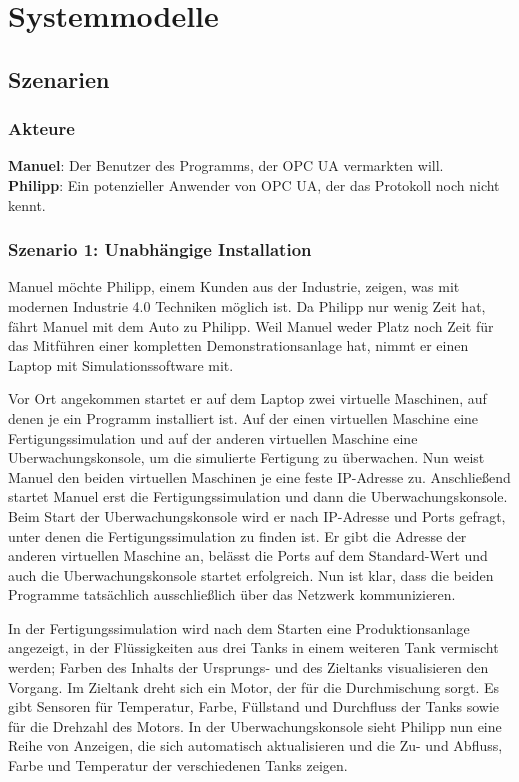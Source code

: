 \documentclass[parskip=full]{scrartcl}
\begin{document}
\pagebreak
\section{Systemmodelle}
\subsection{Szenarien}
\subsubsection*{Akteure}
\textbf{Manuel}: Der Benutzer des Programms, der \gls{OPC UA} vermarkten will.\\
\textbf{Philipp}: Ein potenzieller Anwender von \gls{OPC UA}, der das Protokoll noch nicht kennt.

\subsubsection{Szenario 1: Unabhängige Installation}
Manuel möchte Philipp, einem Kunden aus der Industrie, zeigen, was mit modernen Industrie 4.0 Techniken möglich ist.
Da Philipp nur wenig Zeit hat, fährt Manuel mit dem Auto zu Philipp. Weil Manuel weder Platz noch Zeit für das
Mitführen einer kompletten Demonstrationsanlage hat, nimmt er einen Laptop mit Simulationssoftware mit.

Vor Ort angekommen startet er auf dem Laptop zwei virtuelle Maschinen, auf denen je ein Programm installiert ist.
Auf der einen virtuellen Maschine eine \gls{Fertigungssimulation} und auf der anderen virtuellen Maschine
eine \gls{Uberwachungskonsole}, um die simulierte Fertigung zu überwachen.
Nun weist Manuel den beiden virtuellen Maschinen je eine feste IP-Adresse zu.
Anschlie{\ss}end startet Manuel erst die \gls{Fertigungssimulation} und dann die \gls{Uberwachungskonsole}.
Beim Start der \gls{Uberwachungskonsole} wird er nach IP-Adresse und Ports gefragt, unter denen die \gls{Fertigungssimulation} zu finden ist.
Er gibt die Adresse der anderen virtuellen Maschine an, belässt die Ports auf dem Standard-Wert
und auch die \gls{Uberwachungskonsole} startet erfolgreich.
Nun ist klar, dass die beiden Programme tatsächlich ausschließlich über das Netzwerk kommunizieren.

In der \gls{Fertigungssimulation} wird nach dem Starten eine \gls{Produktionsanlage} angezeigt, in der Flüssigkeiten aus drei Tanks
in einem weiteren Tank vermischt werden; Farben des Inhalts der Ursprungs- und des Zieltanks visualisieren den Vorgang. 
Im Zieltank dreht sich ein Motor, der für die Durchmischung sorgt.
Es gibt Sensoren für Temperatur, Farbe, Füllstand und Durchfluss der Tanks sowie für die Drehzahl des Motors.
In der \gls{Uberwachungskonsole} sieht Philipp nun eine Reihe von Anzeigen, die sich automatisch aktualisieren und
die Zu- und Abfluss, Farbe und Temperatur der verschiedenen Tanks zeigen.
\end{document}
